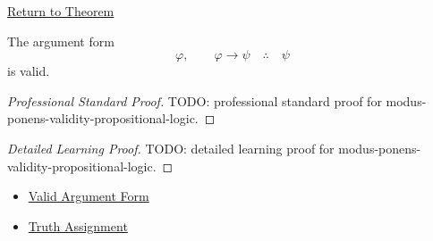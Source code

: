 \newpage
{}
\label{prf:modus-ponens-validity-propositional-logic}

\begin{remark*}[Return]
\hyperref[thm:modus-ponens-validity-propositional-logic]{Return to Theorem}
\end{remark*}

\begin{theorem*}
The argument form
\[
\varphi,\qquad \varphi\to\psi \quad\therefore\quad \psi
\]
is valid.
\end{theorem*}

\begin{proof}[Professional Standard Proof]
\LRAProofBodyStart
TODO: professional standard proof for modus-ponens-validity-propositional-logic.
\end{proof}

\begin{proof}[Detailed Learning Proof]
\LRAProofBodyStart
TODO: detailed learning proof for modus-ponens-validity-propositional-logic.
\end{proof}

\begin{remark*}
\end{remark*}

\begin{dependencies}
\begin{itemize}
  \item \hyperref[def:valid-argument-form-propositional-logic]{Valid Argument Form}
  \item \hyperref[def:truth-assignment-propositional-logic]{Truth Assignment}
\end{itemize}
\end{dependencies}

\clearpage
